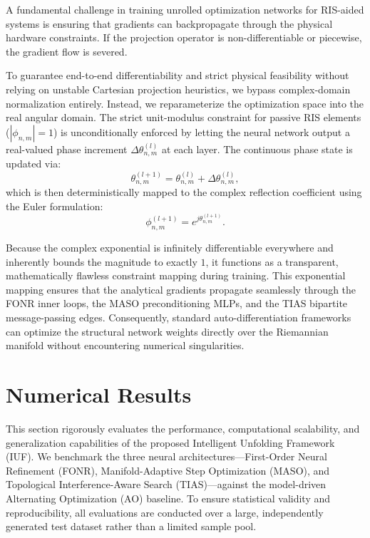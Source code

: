 \documentclass[journal]{IEEEtran}
\begin{document}
A fundamental challenge in training unrolled optimization networks for RIS-aided systems is ensuring that gradients can backpropagate through the physical hardware constraints. If the projection operator is non-differentiable or piecewise, the gradient flow is severed. 

To guarantee end-to-end differentiability and strict physical feasibility without relying on unstable Cartesian projection heuristics, we bypass complex-domain normalization entirely. Instead, we reparameterize the optimization space into the real angular domain. The strict unit-modulus constraint for passive RIS elements ($|\phi_{n,m}| = 1$) is unconditionally enforced by letting the neural network output a real-valued phase increment $\Delta\theta_{n,m}^{(l)}$ at each layer. The continuous phase state is updated via:
\begin{equation}
    \theta_{n,m}^{(l+1)} = \theta_{n,m}^{(l)} + \Delta\theta_{n,m}^{(l)},
\end{equation}
which is then deterministically mapped to the complex reflection coefficient using the Euler formulation:
\begin{equation}
    \phi_{n,m}^{(l+1)} = e^{j\theta_{n,m}^{(l+1)}}.
\end{equation}

Because the complex exponential is infinitely differentiable everywhere and inherently bounds the magnitude to exactly $1$, it functions as a transparent, mathematically flawless constraint mapping during training. This exponential mapping ensures that the analytical gradients propagate seamlessly through the FONR inner loops, the MASO preconditioning MLPs, and the TIAS bipartite message-passing edges. Consequently, standard auto-differentiation frameworks can optimize the structural network weights directly over the Riemannian manifold without encountering numerical singularities.

\section{Numerical Results}
\label{sec:numerical_results}

This section rigorously evaluates the performance, computational scalability, and generalization capabilities of the proposed Intelligent Unfolding Framework (IUF). We benchmark the three neural architectures—First-Order Neural Refinement (FONR), Manifold-Adaptive Step Optimization (MASO), and Topological Interference-Aware Search (TIAS)—against the model-driven Alternating Optimization (AO) baseline. To ensure statistical validity and reproducibility, all evaluations are conducted over a large, independently generated test dataset rather than a limited sample pool.
\end{document}
